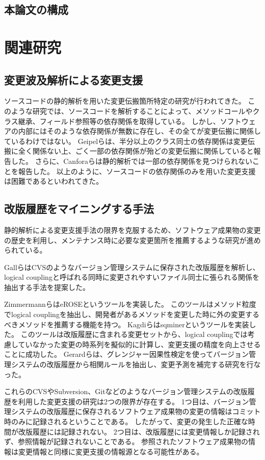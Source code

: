 \documentclass[a4paper]{jsbook}
\begin{document}
\section{本論文の構成}
\chapter{関連研究}
\section{変更波及解析による変更支援}
ソースコードの静的解析を用いた変更伝搬箇所特定の研究が行われてきた\cite{792645}。
このような研究では、ソースコードを解析することによって、メソッドコールやクラス継承、フィールド参照等の依存関係を取得している。
しかし、ソフトウェアの内部にはそのような依存関係が無数に存在し、その全てが変更伝搬に関係しているわけではない。
Geipelら\cite{Geipel:2009}は、半分以上のクラス同士の依存関係は変更伝搬に全く関係ない上、ごく一部の依存関係が殆どの変更伝搬に関係していると報告した。
さらに、Canforaら\cite{5609732}は静的解析では一部の依存関係を見つけられないことを報告した。
以上のように、ソースコードの依存関係のみを用いた変更支援は困難であるといわれてきた。

\section{改版履歴をマイニングする手法}
静的解析による変更支援手法の限界を克服するため、ソフトウェア成果物の変更の歴史を利用し、メンテナンス時に必要な変更箇所を推薦するような研究が進められている。

Gallら\cite{738508}はCVSのようなバージョン管理システムに保存された改版履歴を解析し、logical couplingと呼ばれる同時に変更されやすいファイル同士に張られる関係を抽出する手法を提案した。

ZimmermannらはeROSEというツール\cite{Zimmermann:2005}を実装した。
このツールはメソッド粒度でlogical couplingを抽出し、開発者があるメソッドを変更した時に外の変更するべきメソッドを推薦する機能を持つ。
Kagdiらはsqminerというツール\cite{Kagdi:2006}を実装した。
このツールは改版履歴に含まれる変更セットから、logical couplingでは考慮していなかった変更の時系列を擬似的に計算し、変更支援の精度を向上させることに成功した。
Gerardら\cite{5609732}は、グレンジャー因果性検定を使ってバージョン管理システムの改版履歴から相関ルールを抽出し、変更予測を補完する研究を行なった。

これらのCVSやSubversion、Gitなどのようなバージョン管理システムの改版履歴を利用した変更支援の研究は2つの限界が存在する。
1つ目は、バージョン管理システムの改版履歴に保存されるソフトウェア成果物の変更の情報はコミット時のみに記録されるということである。
したがって、変更の発生した正確な時間が改版履歴には記録されない。
2つ目は、改版履歴には変更情報しか記録されず、参照情報が記録されないことである。
参照されたソフトウェア成果物の情報は変更情報と同様に変更支援の情報源となる可能性がある。
\end{document}
